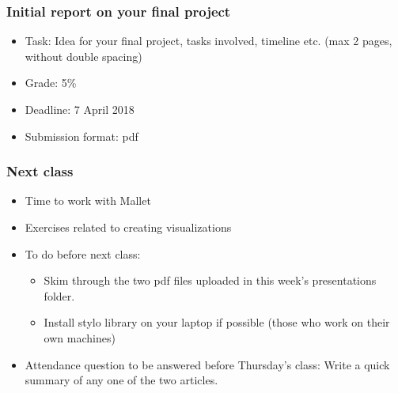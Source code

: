 \documentclass{beamer}
\begin{document}
\begin{frame}
\frametitle{Initial report on your final project}
\begin{itemize}
\item Task: Idea for your final project, tasks involved, timeline etc. (max 2 pages, without double spacing)
\item Grade: 5\%
\item Deadline: 7 April 2018
\item Submission format: pdf
\end{itemize}
\end{frame}

\begin{frame}
\frametitle{Next class}
\begin{itemize}
\item Time to work with Mallet
\item Exercises related to creating visualizations
\item To do before next class:
\begin{itemize}
\item Skim through the two pdf files uploaded in this week's presentations folder. 
\item Install stylo library on your laptop if possible (those who work on their own machines)
\end{itemize}
\item Attendance question to be answered before Thursday's class: Write a quick summary of any one of the two articles.
\end{itemize}
\end{frame}
\end{document}
